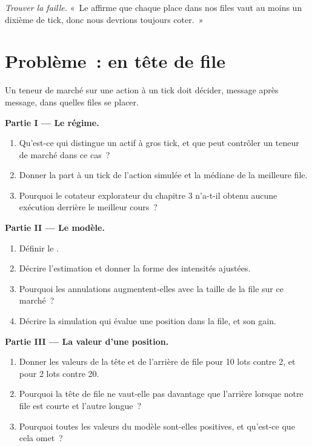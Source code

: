 \begin{exercise}[$\star\star\star$]\label{exo:hf:queue-reactive-models-and-large-tick-assets:8}
\emph{Trouver la faille.} «~Le  affirme que chaque place dans nos files vaut au moins un dixième de tick, donc nous devrions toujours coter.~»
\end{exercise}

\section{Problème~: en tête de file}

\begin{problem}\label{pb:hf:queue-reactive-models-and-large-tick-assets:1}
Un teneur de marché sur une action à un tick doit décider, message après message, dans quelles files se placer.

\medskip\noindent\textbf{Partie I --- Le régime.}
\begin{enumerate}
\item Qu'est-ce qui distingue un actif à gros tick, et que peut contrôler un teneur de marché dans ce cas~?
\item Donner la part à un tick de l'action simulée et la médiane de la meilleure file.
\item Pourquoi le cotateur explorateur du chapitre 3 n'a-t-il obtenu aucune exécution derrière le meilleur cours~?
\end{enumerate}

\medskip\noindent\textbf{Partie II --- Le modèle.}
\begin{enumerate}[resume]
\item Définir le .
\item Décrire l'estimation et donner la forme des intensités ajustées.
\item Pourquoi les annulations augmentent-elles avec la taille de la file sur ce marché~?
\item Décrire la simulation qui évalue une position dans la file, et son gain.
\end{enumerate}

\medskip\noindent\textbf{Partie III --- La valeur d'une position.}
\begin{enumerate}[resume]
\item Donner les valeurs de la tête et de l'arrière de file pour 10 lots contre 2, et pour 2 lots contre 20.
\item Pourquoi la tête de file ne vaut-elle pas davantage que l'arrière lorsque notre file est courte et l'autre longue~?
\item Pourquoi toutes les valeurs du modèle sont-elles positives, et qu'est-ce que cela omet~?
\end{enumerate}


\end{problem}
